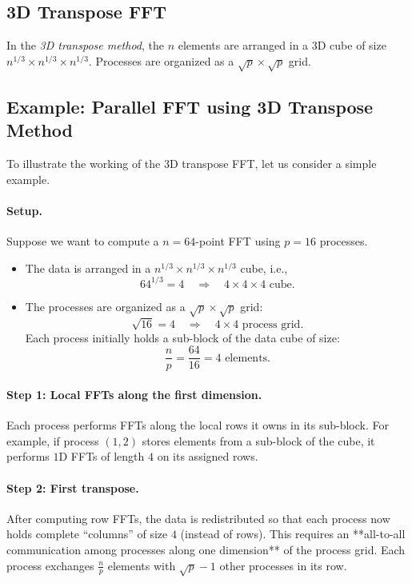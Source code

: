 \documentclass[12pt]{book}
\begin{document}
\subsection*{3D Transpose FFT}
In the \textit{3D transpose method}, the $n$ elements are arranged in a 3D cube of size $n^{1/3}\times n^{1/3}\times n^{1/3}$. Processes are organized as a $\sqrt{p}\times \sqrt{p}$ grid.

\subsection*{Example: Parallel FFT using 3D Transpose Method}

To illustrate the working of the 3D transpose FFT, let us consider a simple example.

\paragraph{Setup.}  
Suppose we want to compute a $n=64$-point FFT using $p=16$ processes.  
\begin{itemize}
    \item The data is arranged in a $n^{1/3} \times n^{1/3} \times n^{1/3}$ cube, i.e.,
    \[
    64^{1/3} = 4 \quad \Rightarrow \quad 4\times 4 \times 4 \text{ cube}.
    \]
    \item The processes are organized as a $\sqrt{p} \times \sqrt{p}$ grid:
    \[
    \sqrt{16} = 4 \quad \Rightarrow \quad 4 \times 4 \text{ process grid}.
    \]
    Each process initially holds a sub-block of the data cube of size:
    \[
    \frac{n}{p} = \frac{64}{16} = 4 \text{ elements}.
    \]
\end{itemize}

\paragraph{Step 1: Local FFTs along the first dimension.}  
Each process performs FFTs along the local rows it owns in its sub-block.  
For example, if process $(1,2)$ stores elements from a sub-block of the cube, it performs $1$D FFTs of length $4$ on its assigned rows.

\paragraph{Step 2: First transpose.}  
After computing row FFTs, the data is redistributed so that each process now holds complete ``columns'' of size $4$ (instead of rows). This requires an **all-to-all communication among processes along one dimension** of the process grid.  
Each process exchanges $\frac{n}{p}$ elements with $\sqrt{p}-1$ other processes in its row.
\end{document}
